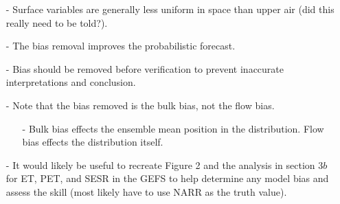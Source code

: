 \documentclass[12pt, letterpaper]{article}
\begin{document}
\begin{itemize}
    	\item[-] Surface variables are generally less uniform in space than upper air (did this really
    	         need to be told?).
    	\item[-] The bias removal improves the probabilistic forecast.
    	\item[-] Bias should be removed before verification to prevent inaccurate interpretations and
    	         conclusion.
    	\item[-] Note that the bias removed is the bulk bias, not the flow bias.
    	\begin{itemize}
    		\item[-] Bulk bias effects the ensemble mean position in the distribution. Flow bias effects
    		         the distribution itself.
    	\end{itemize}
        \item[-] It would likely be useful to recreate Figure 2 and the analysis in section $3b$ for ET,
                 PET, and SESR in the GEFS to help determine any model bias and assess the skill (most
                 likely have to use NARR as the truth value).
    \end{itemize}
\end{document}
